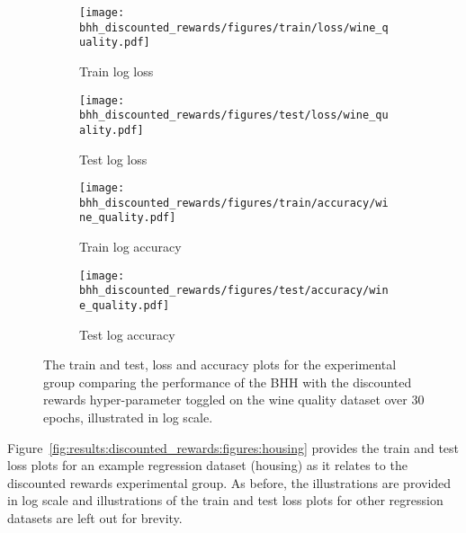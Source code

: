 \begin{figure}[htbp]
      \begin{subfigure}{0.5\textwidth}
            \centering
            \texttt{[image: bhh\_discounted\_rewards/figures/train/loss/wine\_quality.pdf]}
            \caption{Train log loss}
            \label{fig:results:discounted_rewards:figures:loss:train:wine_quality}
      \end{subfigure}
      \begin{subfigure}{0.5\textwidth}
            \centering
            \texttt{[image: bhh\_discounted\_rewards/figures/test/loss/wine\_quality.pdf]}
            \caption{Test log loss}
            \label{fig:results:discounted_rewards:figures:loss:test:wine_quality}
      \end{subfigure}
      \par\bigskip
      \begin{subfigure}{0.5\textwidth}
            \centering
            \texttt{[image: bhh\_discounted\_rewards/figures/train/accuracy/wine\_quality.pdf]}
            \caption{Train log accuracy}
            \label{fig:results:discounted_rewards:figures:accuracy:train:wine_quality}
      \end{subfigure}
      \begin{subfigure}{0.5\textwidth}
            \centering
            \texttt{[image: bhh\_discounted\_rewards/figures/test/accuracy/wine\_quality.pdf]}
            \caption{Test log accuracy}
            \label{fig:results:discounted_rewards:figures:accuracy:test:wine_quality}
      \end{subfigure}
      \par\bigskip
      \caption{The train and test, loss and accuracy plots for the experimental group comparing the performance of the \acs{BHH} with the discounted rewards hyper-parameter toggled on the wine quality dataset over 30 epochs, illustrated in log scale.}
      \label{fig:results:discounted_rewards:figures:wine_quality}
\end{figure}

Figure~\ref{fig:results:discounted_rewards:figures:housing} provides the train and test loss plots for an example regression dataset (housing) as it relates to the discounted rewards experimental group. As before, the illustrations are provided in log scale and illustrations of the train and test loss plots for other regression datasets are left out for brevity.

